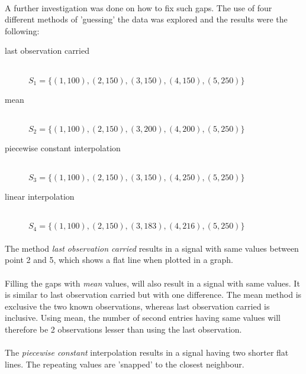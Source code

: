 \paragraph{}
A further investigation was done on how to fix such gaps. The use of four
different methods of 'guessing' the data was explored and the results were the
following:
\begin{description}
	\item[last observation carried] \hfill \\[1em]
	$S_{1} = \{(1,100), (2,150), (3,150), (4,150), (5,250)\}$

	\item[mean] \hfill \\[1em]
	$S_{2} = \{(1,100), (2,150), (3,200), (4,200), (5,250)\}$
	
	\item[piecewise constant interpolation] \hfill \\[1em]
	$S_{3} = \{(1,100), (2,150), (3,150), (4,250), (5,250)\}$
	
	\item[linear interpolation] \hfill \\[1em]
	$S_{4} = \{(1,100), (2,150), (3,183), (4,216), (5,250)\}$
\end{description}

\paragraph{}
The method \textit{last observation carried} results in a signal with
same values between point 2 and 5, which shows a flat line when plotted in a
graph.

\paragraph{}
Filling the gaps with \textit{mean} values, will also result in a signal with
same values. It is similar to last observation carried but with one difference.
The mean method is exclusive the two known observations, whereas last
observation carried is inclusive. Using mean, the number of second entries
having same values will therefore be 2 observations lesser than using the last
observation.

\paragraph{}
The \textit{piecewise constant} interpolation results in a signal having two
shorter flat lines. The repeating values are 'snapped' to the closest
neighbour.

